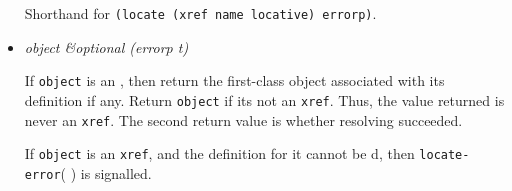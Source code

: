 \begin{itemize}
  Shorthand for \texttt{(locate\ (xref\ name\ locative)\ errorp)}.
\item
  \label{x-28DREF-3ARESOLVE-20FUNCTION-29}
  \emph{object \&optional (errorp t)}

  If \texttt{object} is an
  , then return the
  first-class object associated with its definition if any. Return
  \texttt{object} if it\textquotesingle s not an \texttt{xref}. Thus,
  the value returned is never an \texttt{xref}. The second return value
  is whether resolving succeeded.

\begin{Shaded}
\begin{Highlighting}[]
 \NormalTok{))}
\OperatorTok{=\textgreater{}}
\end{Highlighting}
\end{Shaded}

\begin{Shaded}
\begin{Highlighting}[]
\OperatorTok{\#\textquotesingle{}}
\OperatorTok{=\textgreater{}}
\end{Highlighting}
\end{Shaded}

  If \texttt{object} is an \texttt{xref}, and the definition for it
  cannot be d,
  then
  \texttt{locate-error}(
  ) is
  signalled.

\begin{Shaded}
\begin{Highlighting}[]
 \NormalTok{))}
\end{Highlighting}
\end{Shaded}


\end{itemize}
